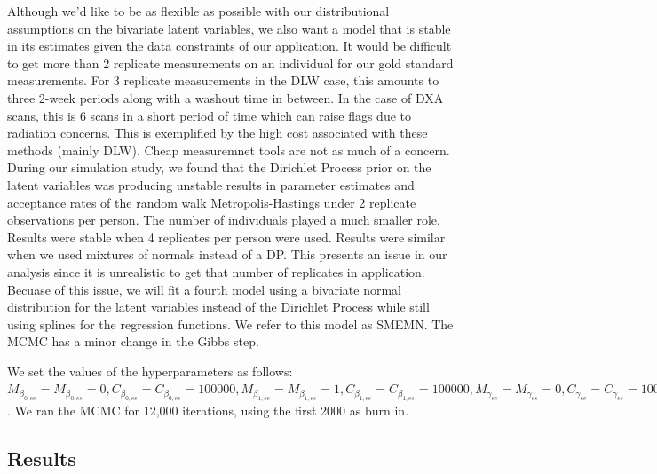 \documentclass[11pt]{article}\usepackage[]{graphicx}\usepackage[]{color}
\begin{document}
Although we'd like to be as flexible as possible with our distributional assumptions on the bivariate latent variables, we also want a model that is stable in its estimates given the data constraints of our application. It would be difficult to get more than 2 replicate measurements on an individual for our gold standard measurements. For 3 replicate measurements in the DLW case, this amounts to three 2-week periods along with a washout time in between. In the case of DXA scans, this is 6 scans in a short period of time which can raise flags due to radiation concerns. This is exemplified by the high cost associated with these methods (mainly DLW). Cheap measuremnet tools are not as much of a concern. During our simulation study, we found that the Dirichlet Process prior on the latent variables was producing unstable results in parameter estimates and acceptance rates of the random walk Metropolis-Hastings under 2 replicate observations per person. The number of individuals played a much smaller role. Results were stable when 4 replicates per person were used. Results were similar when we used mixtures of normals instead of a DP. This presents an issue in our analysis since it is unrealistic to get that number of replicates in application. Becuase of this issue, we will fit a fourth model using a bivariate normal distribution for the latent variables instead of the Dirichlet Process while still using splines for the regression functions. We refer to this model as SMEMN. The MCMC has a minor change in the Gibbs step.

We set the values of the hyperparameters as follows: $M_{\beta_{0,ee}} = M_{\beta_{0,es}} = 0, C_{\beta_{0,ee}} = C_{\beta_{0,es}} = 100000, M_{\beta_{1,ee}} = M_{\beta_{1,es}} = 1, C_{\beta_{1,ee}} = C_{\beta_{1,es}} = 100000, M_{\gamma_{ee}} = M_{\gamma_{es}} = 0, C_{\gamma_{ee}} = C_{\gamma_{es}} = 100000, a_{yee} = a_{yes} = a_{wee} = a_{wes} = b_{yee} = b_{yes} = b_{wee} = b_{wes} = 0.1, \psi = I_{2\times 2}, d = 3, M_{\mu} = (2400,0), C_{\mu} = diag(100000,100000), \lambda_{ee} = \lambda_{es} = 1$. We ran the MCMC for 12,000 iterations, using the first 2000 as burn in. %


\subsection{Results}
\end{document}
